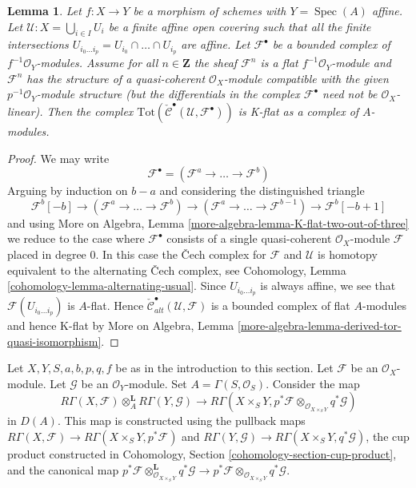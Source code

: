 \documentclass{stacks-project}
\theoremstyle{plain}
\newtheorem{lemma}[subsection]{Lemma}
\theoremstyle{definition}
\theoremstyle{remark}
\numberwithin{equation}{subsection}
\def\Spec{\mathop{\mathrm{Spec}}}
\begin{document}
\begin{lemma}
\label{lemma-K-flat}
Let $f : X \to Y$ be a morphism of schemes with $Y = \Spec(A)$ affine.
Let $\mathcal{U} : X = \bigcup_{i \in I} U_i$ be a finite affine open covering
such that all the finite intersections
$U_{i_0 \ldots i_p} = U_{i_0} \cap \ldots \cap U_{i_p}$
are affine. Let $\mathcal{F}^\bullet$ be a bounded complex of
$f^{-1}\mathcal{O}_Y$-modules. Assume for all $n \in \mathbf{Z}$
the sheaf $\mathcal{F}^n$ is a flat $f^{-1}\mathcal{O}_Y$-module and
$\mathcal{F}^n$ has the structure of a quasi-coherent $\mathcal{O}_X$-module
compatible with the given $p^{-1}\mathcal{O}_Y$-module structure (but the
differentials in the complex $\mathcal{F}^\bullet$ need not
be $\mathcal{O}_X$-linear). Then the complex
$\text{Tot}(\check{\mathcal{C}}^\bullet(\mathcal{U}, \mathcal{F}^\bullet))$
is K-flat as a complex of $A$-modules.
\end{lemma}

\begin{proof}
We may write
$$
\mathcal{F}^\bullet = (\mathcal{F}^a \to \ldots \to \mathcal{F}^b)
$$
Arguing by induction on $b - a$ and considering the distinguished triangle
$$
\mathcal{F}^b[-b] \to (\mathcal{F}^a \to \ldots \to \mathcal{F}^b)
\to (\mathcal{F}^a \to \ldots \to \mathcal{F}^{b - 1}) \to
\mathcal{F}^b[-b + 1]
$$
and using
More on Algebra, Lemma \ref{more-algebra-lemma-K-flat-two-out-of-three}
we reduce to the case where $\mathcal{F}^\bullet$ consists of a
single quasi-coherent $\mathcal{O}_X$-module $\mathcal{F}$
placed in degree $0$. In this case the {\v C}ech complex
for $\mathcal{F}$ and $\mathcal{U}$ is homotopy equivalent to the
alternating {\v C}ech complex, see
Cohomology, Lemma \ref{cohomology-lemma-alternating-usual}.
Since $U_{i_0 \ldots i_p}$ is always affine, we see that
$\mathcal{F}(U_{i_0 \ldots i_p})$ is $A$-flat.
Hence
$\check{\mathcal{C}}_{alt}^\bullet(\mathcal{U}, \mathcal{F})$
is a bounded complex of flat $A$-modules and hence K-flat
by More on Algebra, Lemma
\ref{more-algebra-lemma-derived-tor-quasi-isomorphism}.
\end{proof}

\noindent
Let $X, Y, S, a, b, p, q, f$ be as in the introduction to this section.
Let $\mathcal{F}$ be an $\mathcal{O}_X$-module.
Let $\mathcal{G}$ be an $\mathcal{O}_Y$-module.
Set $A = \Gamma(S, \mathcal{O}_S)$.
Consider the map
\begin{equation}
\label{equation-kunneth-single-sheaves}
R\Gamma(X, \mathcal{F})
\otimes_A^\mathbf{L}
R\Gamma(Y, \mathcal{G})
\longrightarrow
R\Gamma(X \times_S Y,
p^*\mathcal{F}
\otimes_{\mathcal{O}_{X \times_S Y}}
q^*\mathcal{G})
\end{equation}
in $D(A)$. This map is constructed using the pullback maps
$R\Gamma(X, \mathcal{F}) \to R\Gamma(X \times_S Y, p^*\mathcal{F})$ and
$R\Gamma(Y, \mathcal{G}) \to R\Gamma(X \times_S Y, q^*\mathcal{G})$,
the cup product constructed in
Cohomology, Section \ref{cohomology-section-cup-product}, and
the canonical map
$p^*\mathcal{F}
\otimes_{\mathcal{O}_{X \times_S Y}}^\mathbf{L}
q^*\mathcal{G}
\to
p^*\mathcal{F}
\otimes_{\mathcal{O}_{X \times_S Y}}
q^*\mathcal{G}$.
\end{document}
